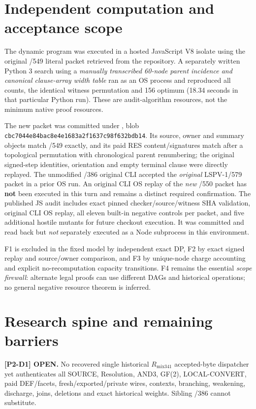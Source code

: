 \documentclass[11pt]{article}
\begin{document}
\section*{Independent computation and acceptance scope}
The dynamic program was executed in a hosted JavaScript V8 isolate using the original /549 literal packet retrieved from the repository. A separately written Python 3 search using a \emph{manually transcribed 60-node parent incidence and canonical clause-array width table} ran as an OS process and reproduced all counts, the identical witness permutation and 156 optimum (18.34 seconds in that particular Python run). These are audit-algorithm resources, not the minimum native proof resources.

The new packet was committed under
,
blob \texttt{cbc7044e84bac8e4e1683a2f1637c98f632bdb14}.
Its source, owner and summary objects match /549 exactly, and its paid RES content/signatures match after a topological permutation with chronological parent renumbering; the original signed-step identities, orientation and empty terminal clause were directly replayed. The unmodified /386 original CLI accepted the \emph{original} LSPV-1/579 packet in a prior OS run. An original CLI OS replay of the \emph{new} /550 packet has \textbf{not} been executed in this turn and remains a distinct required confirmation. The published JS audit includes exact pinned checker/source/witness SHA validation, original CLI OS replay, all eleven built-in negative controls per packet, and five additional hostile mutants for future checkout execution. It was committed and read back but \emph{not} separately executed as a Node subprocess in this environment.

F1 is excluded in the fixed model by independent exact DP, F2 by exact signed replay and source/owner comparison, and F3 by unique-node charge accounting and explicit no-recomputation capacity transitions. F4 remains the essential \emph{scope firewall}: alternate legal proofs can use different DAGs and historical operations; no general negative resource theorem is inferred.

\section*{Research spine and remaining barriers}
\textbf{[P2-D1] OPEN.} No recovered single historical $R_{\mathrm{mix341}}$ accepted-byte dispatcher yet authenticates all SOURCE, Resolution, AND3, GF(2), LOCAL-CONVERT, paid DEF/facets, fresh/exported/private wires, contexts, branching, weakening, discharge, joins, deletions and exact historical weights. Sibling /386 cannot substitute.
\end{document}

